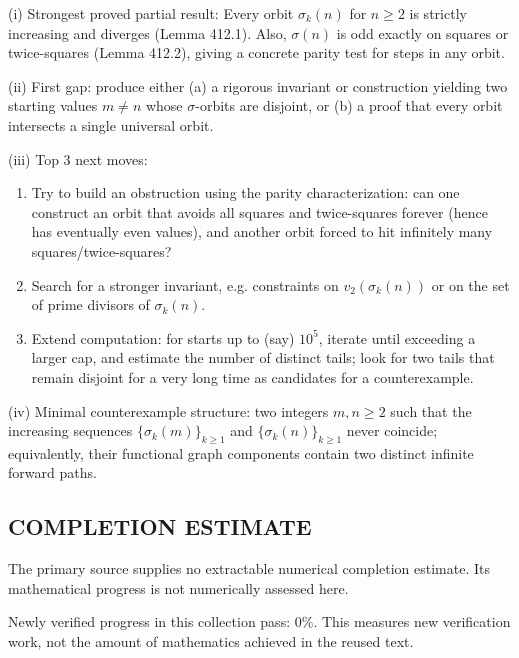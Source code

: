 (i) Strongest proved partial result: Every orbit $\sigma_k(n)$ for $n\ge2$ is strictly increasing and diverges (Lemma 412.1). Also, $\sigma(n)$ is odd exactly on squares or twice-squares (Lemma 412.2), giving a concrete parity test for steps in any orbit.

(ii) First gap: produce either (a) a rigorous invariant or construction yielding two starting values $m\ne n$ whose $\sigma$-orbits are disjoint, or (b) a proof that every orbit intersects a single universal orbit.

(iii) Top 3 next moves:
\begin{enumerate}
  \item Try to build an obstruction using the parity characterization: can one construct an orbit that avoids all squares and twice-squares forever (hence has eventually even values), and another orbit forced to hit infinitely many squares/twice-squares?
  \item Search for a stronger invariant, e.g. constraints on $v_2(\sigma_k(n))$ or on the set of prime divisors of $\sigma_k(n)$.
  \item Extend computation: for starts up to (say) $10^5$, iterate until exceeding a larger cap, and estimate the number of distinct tails; look for two tails that remain disjoint for a very long time as candidates for a counterexample.
\end{enumerate}

(iv) Minimal counterexample structure: two integers $m,n\ge2$ such that the increasing sequences $\{\sigma_k(m)\}_{k\ge1}$ and $\{\sigma_k(n)\}_{k\ge1}$ never coincide; equivalently, their functional graph components contain two distinct infinite forward paths.




\subsection*{COMPLETION ESTIMATE}
The primary source supplies no extractable numerical completion estimate. Its mathematical progress is not numerically assessed here.

Newly verified progress in this collection pass: $0\%$. This measures new verification work, not the amount of mathematics achieved in the reused text.
